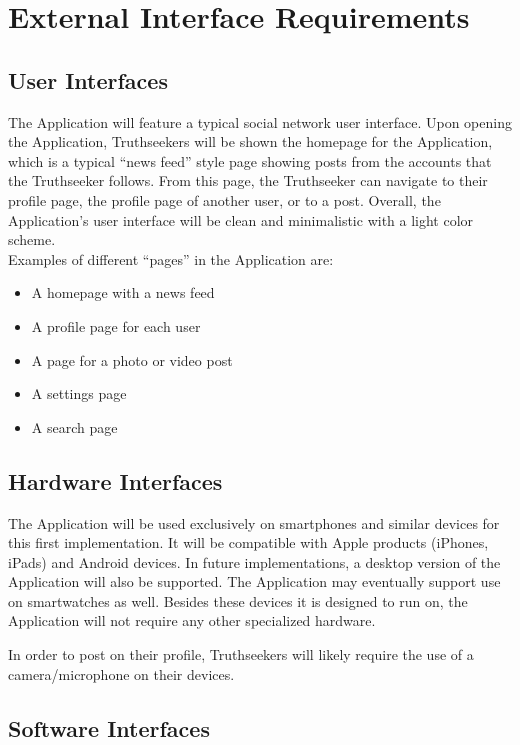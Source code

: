 \newpage

\chapter{External Interface Requirements}
\label{InterfaceRequirements}

\section{User Interfaces}

The Application will feature a typical social network user interface. Upon opening the Application, Truthseekers will be shown the homepage for the Application, which is a typical “news feed” style page showing posts from the accounts that the Truthseeker follows. From this page, the Truthseeker can navigate to their profile page, the profile page of another user, or to a post. Overall, the Application’s user interface will be clean and minimalistic with a light color scheme. \\

Examples of different “pages” in the Application are:

\begin{itemize}
\item A homepage with a news feed
\item A profile page for each user
\item A page for a photo or video post
\item A settings page
\item A search page
\end{itemize}

\section{Hardware Interfaces}

The Application will be used exclusively on smartphones and similar devices for this first implementation. It will be compatible with Apple products (iPhones, iPads) and Android devices. In future implementations, a desktop version of the Application will also be supported. The Application may eventually support use on smartwatches as well. Besides these devices it is designed to run on, the Application will not require any other specialized hardware.

In order to post on their profile, Truthseekers will likely require the use of a camera/microphone on their devices.


\section{Software Interfaces}

